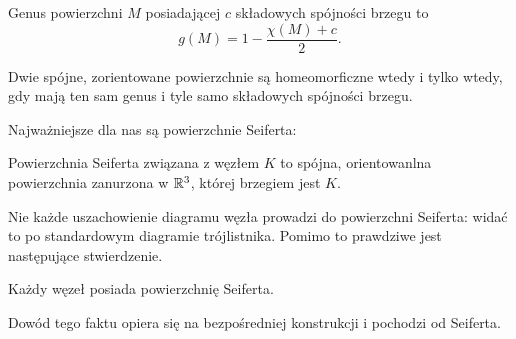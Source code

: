 \begin{definition}
    Genus powierzchni $M$ posiadającej $c$ składowych spójności brzegu to
    \[
        g(M) = 1 - \frac{\chi(M) + c}{2}.
    \]
\end{definition}

\begin{proposition}
    Dwie spójne, zorientowane powierzchnie są homeomorficzne wtedy i tylko
    wtedy, gdy mają ten sam genus i tyle samo składowych spójności brzegu.
\end{proposition}

Najważniejsze dla nas są powierzchnie Seiferta:

\begin{definition}
    Powierzchnia Seiferta związana z węzłem $K$ to spójna,
    orientowanlna powierzchnia zanurzona w $\mathbb R^3$, której brzegiem jest $K$.
\end{definition}


Nie każde uszachowienie diagramu węzła prowadzi do powierzchni Seiferta:
widać to po standardowym diagramie trójlistnika.
Pomimo to prawdziwe jest następujące stwierdzenie.

\begin{proposition}
    Każdy węzeł posiada powierzchnię Seiferta.
\end{proposition}

Dowód tego faktu opiera się na bezpośredniej konstrukcji i pochodzi od Seiferta.

